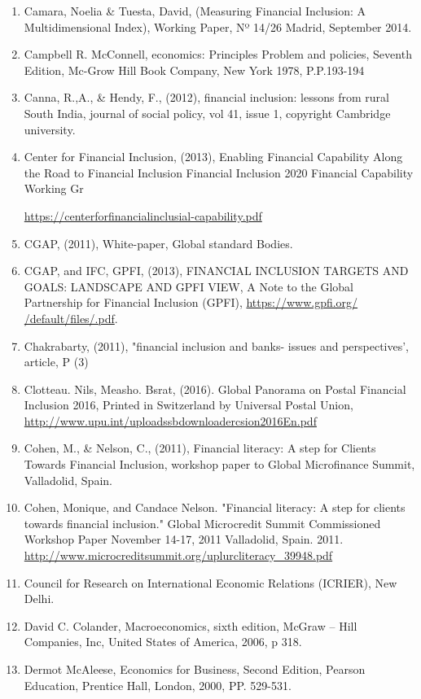 \documentclass[10pt,a4paper]{report}
\begin{document}
\begin{english}
\begin{enumerate}
	\item Camara, Noelia \& Tuesta, David, (Measuring Financial Inclusion: A Multidimensional Index), Working Paper, Nº 14/26 Madrid, September 2014.
	\item Campbell R. McConnell, economics: Principles Problem and policies, Seventh Edition, Mc-Grow Hill Book Company, New York 1978, P.P.193-194
	\item Canna, R.,A., \& Hendy, F., (2012), financial inclusion: lessons from rural South India, journal of social policy, vol 41, issue 1, copyright Cambridge university.
	\item Center for Financial Inclusion, (2013), Enabling Financial Capability Along the Road to Financial Inclusion Financial Inclusion 2020 Financial Capability Working Gr
	
	 \url{https://centerforfinancialinclusial-capability.pdf}
	\item CGAP, (2011), White-paper, Global standard Bodies.
	\item CGAP, and IFC, GPFI, (2013), FINANCIAL INCLUSION TARGETS AND GOALS: LANDSCAPE AND GPFI VIEW, A Note to the Global Partnership for Financial Inclusion (GPFI), \url{https://www.gpfi.org/ /default/files/.pdf}.
	\item Chakrabarty, (2011), "financial inclusion and banks- issues and perspectives', article, P (3)
	\item Clotteau. Nils, Measho. Bsrat, (2016). Global Panorama on Postal Financial Inclusion 2016, Printed in Switzerland by Universal Postal Union, \url{http://www.upu.int/uploadssbdownloadercsion2016En.pdf}
	\item Cohen, M., \& Nelson, C., (2011), Financial literacy: A step for Clients Towards Financial Inclusion, workshop paper to Global Microfinance Summit, Valladolid, Spain.
	\item Cohen, Monique, and Candace Nelson. "Financial literacy: A step for clients towards financial inclusion." Global Microcredit Summit Commissioned Workshop Paper November 14-17, 2011 Valladolid, Spain. 2011. \url{http://www.microcreditsummit.org/uplurcliteracy_39948.pdf}
	\item Council for Research on International Economic Relations (ICRIER), New Delhi.
	\item David C. Colander, Macroeconomics, sixth edition, McGraw – Hill Companies, Inc, United States of America, 2006, p 318.
	\item Dermot McAleese, Economics for Business, Second Edition, Pearson Education, Prentice Hall, London, 2000, PP. 529-531.

\end{enumerate}
\end{english}
\end{document}
